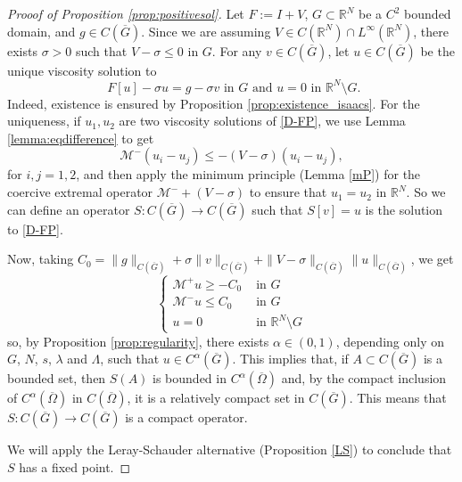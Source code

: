 \documentclass[a4paper,11pt]{article}
\newcommand{\R}{\mathbb{R}}
\newcommand{\M}{\mathcal{M}}
\newcommand{\I}{I}
\begin{document}
\begin{proof}[Prooof of Proposition \ref{prop:positivesol}]
	Let $F:=\I +V$,  $G\subset \R^N$ be a $C^2$ bounded domain, and $g \in C(\overline{G})$. Since we are assuming $V\in C(\R^N) \cap L^{\infty}(\R^N)$, there exists $\sigma >0$ such that $V-\sigma \leq 0$ in $G$. For any $v\in C(\overline{G})$, let $u \in C(\overline{G})$ be the unique viscosity solution to
	\begin{equation}\label{D-FP}
\textrm{		$F[u] -\sigma u= g- \sigma v$ in $G$ and $u = 0$ in $\R^N \setminus G$. }
	\end{equation}
Indeed, existence is ensured by Proposition \ref{prop:existence_isaacs}. 
For the uniqueness, if $u_1, u_2$ are two viscosity solutions of \eqref{D-FP}, we use Lemma \ref{lemma:eqdifference} to get 
\[\M^{-}(u_i - u_j) \leq -(V - \sigma)(u_i - u_j),\]
for $ i,j = 1,2$, and then apply the minimum principle (Lemma \ref{mP}) for the coercive extremal operator $\M^- + (V -\sigma) $ to ensure that $u_1=u_2$ in $\R^N$.
	So we can define an operator $S:C(\overline{G}) \rightarrow C(\overline{G})$ such that $S[v] = u$ is the solution to \eqref{D-FP}.

Now, taking $C_{0} = \|g\|_{C(\overline{G})} + \sigma\|v\|_{C(\overline{G})} + \|V- \sigma\|_{C(\overline{G})} \|u\|_{C(\overline{G})} $, we get
\[\begin{cases}
\M^+u \geq -C_{0} & \text{ in }G \\
\M^-u \leq C_{0} & \text{ in }G \\
u= 0 & \text{ in }\R^N\setminus G
\end{cases}\]
so, by Proposition \ref{prop:regularity}, there exists $\alpha \in (0,1)$, depending only on $G$, $N$, $s$, $\lambda$ and $\Lambda$, such that $u \in C^{ \alpha}(\overline{G})$. This implies that, if $A\subset C(\overline{G})$ is a bounded set, then $S(A)$ is bounded in $C^{\alpha}(\overline{\Omega})$ and, by the compact inclusion of $C^{\alpha}(\overline{\Omega})$ in $C(\overline{\Omega})$, it is a relatively compact set in $C(\overline{G})$. This means that $S: C(\overline{G}) \rightarrow C(\overline{G})$ is a compact operator. 

We will apply the Leray-Schauder alternative (Proposition \ref{LS}) to conclude that $S$ has a fixed point.


\end{proof}
\end{document}
